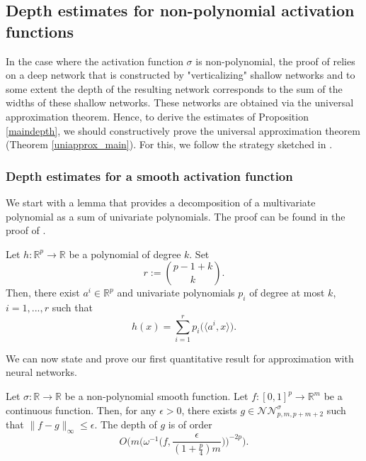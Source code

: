 \documentclass[anon,12pt]{colt2021} %
\begin{document}
\subsection{Depth estimates for non-polynomial activation functions}

In the case where the activation function $\sigma$ is non-polynomial, the proof of \citep[Theorem 3.2]{kidger2019universal} relies on a deep network that is constructed by "verticalizing" shallow networks and to some extent the depth of the resulting network corresponds to the sum of the widths of these shallow networks. These networks are obtained via the universal approximation theorem. Hence, to derive the estimates of Proposition \ref{maindepth}, we should constructively prove the universal approximation theorem (Theorem \ref{uniapprox_main}). For this, we follow the strategy sketched in \citep[section 3]{PinkusMLP}.

\subsubsection{Depth estimates for a smooth activation function}

We start with a lemma that provides a decomposition of a multivariate polynomial as a sum of univariate polynomials. The proof can be found in the proof of \citep[Theorem 4.1]{PinkusMLP}.

\begin{lemma} \label{MultiAsUni}
Let $h: \mathbb{R}^{p} \rightarrow \mathbb{R}$ be a polynomial of degree $k$. Set
\begin{equation} \label{defr}
    r := 
    \binom{p - 1 + k}{k}
    .
\end{equation}
Then, there exist $a^{i} \in \mathbb{R}^{p}$ and univariate polynomials $p_{i}$ of degree at most $k$, $i=1,...,r$ such that
\begin{equation*}
    h(x) = \sum_{i=1}^{r} p_{i} \big( \langle a^{i}, x \rangle \big).
\end{equation*}
\end{lemma}

We can now state and prove our first quantitative result for approximation with neural networks.

\begin{proposition} \label{propsmmoth}
Let $\sigma : \mathbb{R} \rightarrow \mathbb{R}$ be a non-polynomial smooth function. Let $f: [0,1]^{p} \rightarrow \mathbb{R}^{m}$ be a continuous function. Then, for any $\epsilon > 0$, there exists $g \in \mathcal{NN}_{p,m,p+m+2}^{\sigma}$ such that $\| f - g \|_{\infty} \leq \epsilon$. The depth of $g$ is of order
\begin{equation} \label{depthsmooth}
    O\bigg(m \bigg(\omega^{-1} \big(f, \frac{\epsilon}{(1+\frac{p}{4})m} \big) \bigg)^{-2p} \bigg).
\end{equation}
\end{proposition}
\end{document}
